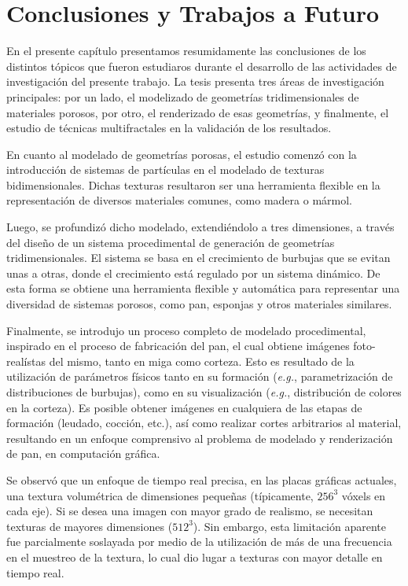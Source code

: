 \chapter{Conclusiones y Trabajos a Futuro}
En el presente capítulo presentamos resumidamente las conclusiones de los distintos tópicos que fueron estudiaros durante el desarrollo de las actividades de investigación del presente trabajo.
La tesis presenta tres áreas de investigación principales: por un lado, el modelizado de geometrías tridimensionales de materiales porosos, por otro, el renderizado de esas geometrías, y finalmente, el estudio de técnicas multifractales en la validación de los resultados.

En cuanto al modelado de geometrías porosas, el estudio comenzó con la introducción de sistemas de partículas en el modelado de texturas bidimensionales.
Dichas texturas resultaron ser una herramienta flexible en la representación de diversos materiales comunes, como madera o mármol.

Luego, se profundizó dicho modelado, extendiéndolo a tres dimensiones, a través del diseño de un sistema procedimental de generación de geometrías tridimensionales.
El sistema se basa en el crecimiento de burbujas que se evitan unas a otras, donde el crecimiento está regulado por un sistema dinámico.
De esta forma se obtiene una herramienta flexible y automática para representar una diversidad de sistemas porosos, como pan, esponjas y otros materiales similares.

Finalmente, se introdujo un proceso completo de modelado procedimental, inspirado en el proceso de fabricación del pan, el cual obtiene imágenes foto-realístas del mismo, tanto en miga como corteza.
Esto es resultado de la utilización de parámetros físicos tanto en su formación ({\em e.g.}, parametrización de distribuciones de burbujas), como en su visualización ({\em e.g.}, distribución de colores en la corteza).
Es posible obtener imágenes en cualquiera de las etapas de formación (leudado, cocción, etc.), así como realizar cortes arbitrarios al material, resultando en un enfoque comprensivo al problema de modelado y renderización de pan, en computación gráfica.

Se observó que un enfoque de tiempo real precisa, en las placas gráficas actuales, una textura volumétrica de dimensiones pequeñas (típicamente, $256^{3}$ vóxels en cada eje).
Si se desea una imagen con mayor grado de realismo, se necesitan texturas de mayores dimensiones ($512^{3}$).
Sin embargo, esta limitación aparente fue parcialmente soslayada por medio de la utilización de más de una frecuencia en el muestreo de la textura, lo cual dio lugar a texturas con mayor detalle en tiempo real.

